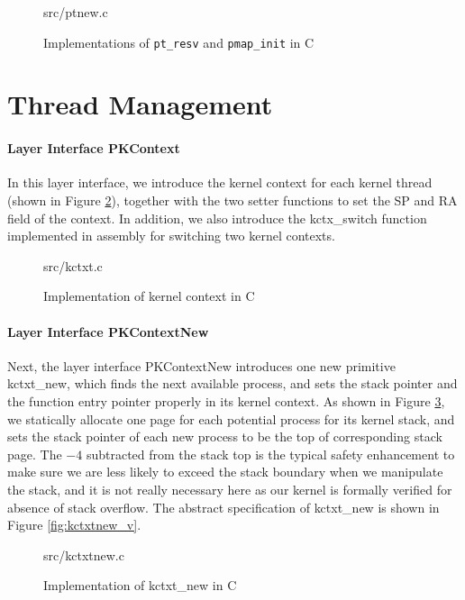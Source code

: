 \begin{figure}
	 {src/ptnew.c}
	\caption{Implementations of \texttt{pt\_resv} and \texttt{pmap\_init} in C}
	\label{fig:ptnew_c}
\end{figure}


\section{Thread Management}

\paragraph{Layer Interface PKContext}

In this layer interface, we introduce the kernel context for each kernel thread (shown in Figure \ref{fig:kctxt_c}),
together with the two setter functions to set the \textsf{SP} and \textsf{RA} field of the context.
In addition, we also introduce the \textsf{kctx\_switch} function implemented in assembly for switching two kernel contexts.

\begin{figure}
	 {src/kctxt.c}
	\caption{Implementation of kernel context in C}
	\label{fig:kctxt_c}
\end{figure}


\paragraph{Layer Interface PKContextNew}

Next, the layer interface PKContextNew introduces one new primitive \textsf{kctxt\_new}, which finds the next
available process, and sets the stack pointer and the function entry pointer properly in its kernel context.
As shown in Figure \ref{fig:kctxtnew_c}, we statically allocate one page for each potential process for its kernel
stack, and sets the stack pointer of each new process to be the top of corresponding stack page.
The $-4$ subtracted from the stack top is the typical safety enhancement to make sure we are less likely to
exceed the stack boundary when we manipulate the stack, and it is not really necessary here as our kernel
is formally verified for absence of stack overflow.
The abstract specification of \textsf{kctxt\_new} is shown in Figure \ref{fig:kctxtnew_v}.

\begin{figure}
	 {src/kctxtnew.c}
	\caption{Implementation of \textsf{kctxt\_new} in C}
	\label{fig:kctxtnew_c}
\end{figure}

